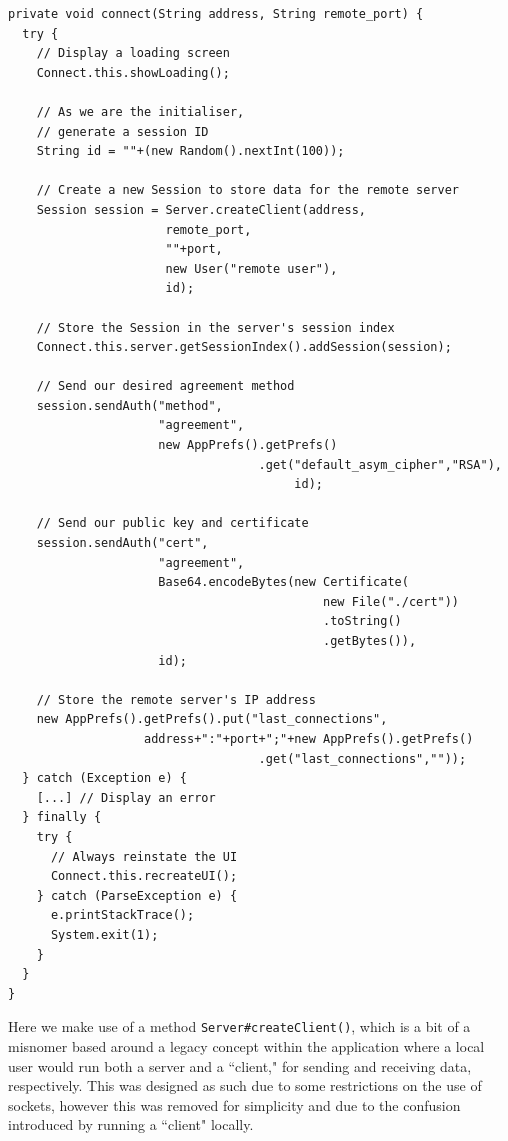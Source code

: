     \begin{lstlisting}
private void connect(String address, String remote_port) {
  try {
    // Display a loading screen
    Connect.this.showLoading();
    
    // As we are the initialiser,
    // generate a session ID
    String id = ""+(new Random().nextInt(100));
    
    // Create a new Session to store data for the remote server
    Session session = Server.createClient(address,
                      remote_port,
                      ""+port,
                      new User("remote user"),
                      id);
                      
    // Store the Session in the server's session index
    Connect.this.server.getSessionIndex().addSession(session);

    // Send our desired agreement method
    session.sendAuth("method",
                     "agreement",
                     new AppPrefs().getPrefs()
                                   .get("default_asym_cipher","RSA"),
                                        id);
                                        
    // Send our public key and certificate
    session.sendAuth("cert",
                     "agreement",
                     Base64.encodeBytes(new Certificate(
                                            new File("./cert"))
                                            .toString()
                                            .getBytes()),
                     id);
    
    // Store the remote server's IP address
    new AppPrefs().getPrefs().put("last_connections",
                   address+":"+port+";"+new AppPrefs().getPrefs()
                                   .get("last_connections",""));
  } catch (Exception e) {
    [...] // Display an error
  } finally {
    try {
      // Always reinstate the UI
      Connect.this.recreateUI();
    } catch (ParseException e) {
      e.printStackTrace();
      System.exit(1);
    }
  }
}
\end{lstlisting}
    
    Here we make use of a method \verb!Server#createClient()!, which is a bit of a misnomer based around a legacy concept within the application where a local user would run both a server and a ``client," for sending and receiving data, respectively. This was designed as such due to some restrictions on the use of sockets, however this was removed for simplicity and due to the confusion introduced by running a ``client" locally.
    
